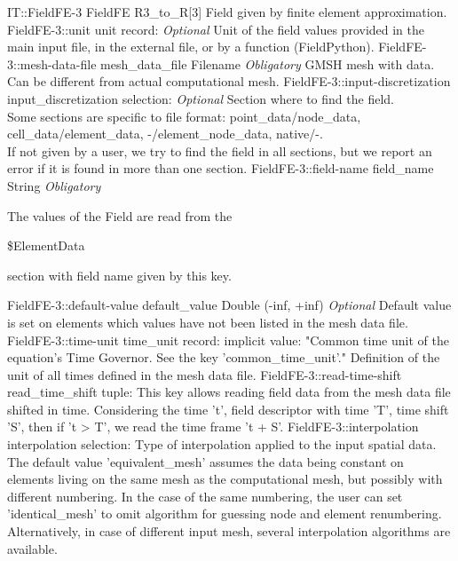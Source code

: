 \begin{RecordType}
	{IT::FieldFE-3}
	{FieldFE}
	{}%
	{}%
	{{{R3{\_}to{\_}R[3] Field given by finite element approximation.}%
}}
		\RecKey
			{FieldFE-3::unit}
			{unit}
			{{record: }}{}
			{ \it{Optional}}
			{{{Unit of the field values provided in the main input file, in the external file, or by a function (FieldPython).}%
}}
		\RecKey
			{FieldFE-3::mesh-data-file}
			{mesh{\_}data{\_}file}
			{{Filename}}{}
			{ \it{Obligatory}}
			{{{GMSH mesh with data.
Can be different from actual computational mesh.}%
}}
		\RecKey
			{FieldFE-3::input-discretization}
			{input{\_}discretization}
			{{selection: }}{}
			{ \it{Optional}}
			{{{Section where to find the field.}\\{
 Some sections are specific to file format: point{\_}data/node{\_}data, cell{\_}data/element{\_}data, -/element{\_}node{\_}data, native/-.}\\{
If not given by a user, we try to find the field in all sections, but we report an error if it is found in more than one section.}%
}}
		\RecKey
			{FieldFE-3::field-name}
			{field{\_}name}
			{{String}}{}
			{ \it{Obligatory}}
			{{{The values of the Field are read from the }\begin{ttfamily}{\$}ElementData\end{ttfamily}{ section with field name given by this key.}%
}}
		\RecKey
			{FieldFE-3::default-value}
			{default{\_}value}
			{{Double (-inf, +inf)}}{}
			{ \it{Optional}}
			{{{Default value is set on elements which values have not been listed in the mesh data file.}%
}}
		\RecKey
			{FieldFE-3::time-unit}
			{time{\_}unit}
			{{record: }}{}
			{implicit value: "{Common time unit of the equation's Time Governor.
See the key 'common{\_}time{\_}unit'.}"}
			{{{Definition of the unit of all times defined in the mesh data file.}%
}}
		\RecKey
			{FieldFE-3::read-time-shift}
			{read{\_}time{\_}shift}
			{{tuple: }}{}
			{ }
			{{{This key allows reading field data from the mesh data file shifted in time.
Considering the time 't', field descriptor with time 'T', time shift 'S', then if 't {\textgreater} T', we read the time frame 't + S'.}%
}}
		\RecKey
			{FieldFE-3::interpolation}
			{interpolation}
			{{selection: }}{}
			{ }
			{{{Type of interpolation applied to the input spatial data.}\\{
The default value 'equivalent{\_}mesh' assumes the data being constant on elements living on the same mesh as the computational mesh, but possibly with different numbering.
In the case of the same numbering, the user can set 'identical{\_}mesh' to omit algorithm for guessing node and element renumbering.
Alternatively, in case of different input mesh, several interpolation algorithms are available.}%
}}
\end{RecordType}
